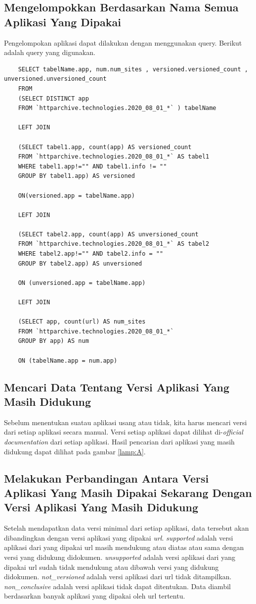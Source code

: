 \subsection{Mengelompokkan Berdasarkan Nama Semua Aplikasi Yang Dipakai}
Pengelompokan aplikasi dapat dilakukan dengan menggunakan query. Berikut adalah query yang digunakan.
\begin{lstlisting}
	SELECT tabelName.app, num.num_sites , versioned.versioned_count , unversioned.unversioned_count
	FROM 
	(SELECT DISTINCT app
	FROM `httparchive.technologies.2020_08_01_*` ) tabelName
	
	LEFT JOIN 
	
	(SELECT tabel1.app, count(app) AS versioned_count
	FROM `httparchive.technologies.2020_08_01_*` AS tabel1
	WHERE tabel1.app!="" AND tabel1.info != "" 
	GROUP BY tabel1.app) AS versioned
	
	ON(versioned.app = tabelName.app)
	
	LEFT JOIN
	
	(SELECT tabel2.app, count(app) AS unversioned_count
	FROM `httparchive.technologies.2020_08_01_*` AS tabel2
	WHERE tabel2.app!="" AND tabel2.info = "" 
	GROUP BY tabel2.app) AS unversioned
	
	ON (unversioned.app = tabelName.app)
	
	LEFT JOIN 
	
	(SELECT app, count(url) AS num_sites
	FROM `httparchive.technologies.2020_08_01_*`
	GROUP BY app) AS num
	
	ON (tabelName.app = num.app)
\end{lstlisting}

\subsection{Mencari Data Tentang Versi Aplikasi Yang Masih Didukung}
Sebelum menentukan suatau aplikasi usang atau tidak, kita harus mencari versi dari setiap aplikasi secara manual. Versi setiap aplikasi dapat dilihat di-\textit{official documentation} dari setiap aplikasi. Hasil pencarian dari aplikasi yang masih didukung dapat dilihat pada gambar \ref{lamp:A}. 

\subsection{Melakukan Perbandingan Antara Versi Aplikasi Yang Masih Dipakai Sekarang Dengan Versi Aplikasi Yang Masih Didukung}
Setelah mendapatkan data versi minimal dari setiap aplikasi, data tersebut akan dibandingkan dengan versi aplikasi yang dipakai \textit{url}. \textit{supported} adalah versi aplikasi dari yang dipakai url masih mendukung atau diatas atau sama dengan versi yang didukung didokumen. \textit{unsupported} adalah versi aplikasi dari yang dipakai url sudah tidak mendukung atau dibawah versi yang didukung didokumen. \textit{not\_versioned} adalah versi aplikasi dari url tidak ditampilkan. \textit{non\_conclusive} adalah versi aplikasi tidak dapat ditentukan. Data diambil berdasarkan banyak aplikasi yang dipakai oleh url tertentu.


